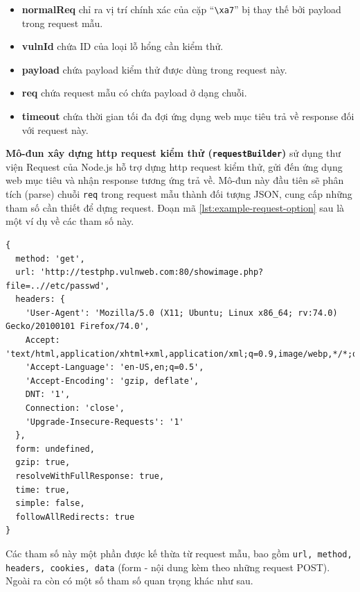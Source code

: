 \begin{itemize}
    \item \textbf{normalReq} chỉ ra vị trí chính xác của cặp ``\texttt{\textbackslash xa7}'' bị thay thế bởi payload trong request mẫu.
    \item \textbf{vulnId} chứa ID của loại lỗ hổng cần kiểm thử.
    \item \textbf{payload} chứa payload kiểm thử được dùng trong request này.
    \item \textbf{req} chứa request mẫu có chứa payload ở dạng chuỗi.
    \item \textbf{timeout} chứa thời gian tối đa đợi ứng dụng web mục tiêu trả về response đối với request này.
\end{itemize}
\textbf{Mô-đun xây dựng \acrshort{http} request kiểm thử (\texttt{requestBuilder})} sử dụng thư viện Request \parencite{request-npm} của Node.js hỗ trợ dựng \acrshort{http} request kiểm thử, gửi đến ứng dụng web mục tiêu và nhận response tương ứng trả về. Mô-đun này đầu tiên sẽ phân tích (parse) chuỗi \texttt{req} trong request mẫu thành đối tượng JSON, cung cấp những tham số cần thiết để dựng request. Đoạn mã \ref{lst:example-request-option} sau là một ví dụ về các tham số này.
\begin{lstlisting}[style=ES6, label={lst:example-request-option}, caption={Ví dụ về tham số xây dựng request kiểm thử}]
{ 
  method: 'get',
  url: 'http://testphp.vulnweb.com:80/showimage.php?file=..//etc/passwd',
  headers: { 
    'User-Agent': 'Mozilla/5.0 (X11; Ubuntu; Linux x86_64; rv:74.0) Gecko/20100101 Firefox/74.0',
    Accept: 'text/html,application/xhtml+xml,application/xml;q=0.9,image/webp,*/*;q=0.8',
    'Accept-Language': 'en-US,en;q=0.5',
    'Accept-Encoding': 'gzip, deflate',
    DNT: '1',
    Connection: 'close',
    'Upgrade-Insecure-Requests': '1' 
  },
  form: undefined,
  gzip: true,
  resolveWithFullResponse: true,
  time: true,
  simple: false,
  followAllRedirects: true
}
\end{lstlisting}
Các tham số này một phần được kế thừa từ request mẫu, bao gồm \texttt{url, method, headers, cookies, data} (form - nội dung kèm theo những request POST). Ngoài ra còn có một số tham số quan trọng khác như sau.
